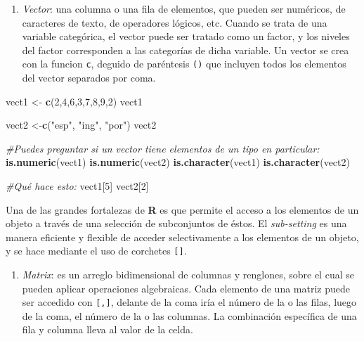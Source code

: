 \documentclass[]{article}
\newenvironment{Shaded}{\begin{snugshade}}{\end{snugshade}}
\newcommand{\CommentTok}[1]{\textcolor[rgb]{0.56,0.35,0.01}{\textit{#1}}}
\newcommand{\DecValTok}[1]{\textcolor[rgb]{0.00,0.00,0.81}{#1}}
\newcommand{\KeywordTok}[1]{\textcolor[rgb]{0.13,0.29,0.53}{\textbf{#1}}}
\newcommand{\NormalTok}[1]{#1}
\newcommand{\StringTok}[1]{\textcolor[rgb]{0.31,0.60,0.02}{#1}}
\providecommand{\tightlist}{%
  \setlength{\itemsep}{0pt}\setlength{\parskip}{0pt}}
\begin{document}
\begin{enumerate}
\def\labelenumi{\Alph{enumi})}
\tightlist
\item
  \emph{Vector}: una columna o una fila de elementos, que pueden ser
  numéricos, de caracteres de texto, de operadores lógicos, etc. Cuando
  se trata de una variable categórica, el vector puede ser tratado como
  un factor, y los niveles del factor corresponden a las categorías de
  dicha variable. Un vector se crea con la funcion \texttt{c}, deguido
  de paréntesis \texttt{()} que incluyen todos los elementos del vector
  separados por coma.
\end{enumerate}

\begin{Shaded}
\begin{Highlighting}[]
\NormalTok{vect1 <-}\StringTok{ }\KeywordTok{c}\NormalTok{(}\DecValTok{2}\NormalTok{,}\DecValTok{4}\NormalTok{,}\DecValTok{6}\NormalTok{,}\DecValTok{3}\NormalTok{,}\DecValTok{7}\NormalTok{,}\DecValTok{8}\NormalTok{,}\DecValTok{9}\NormalTok{,}\DecValTok{2}\NormalTok{)}
\NormalTok{vect1}

\NormalTok{vect2 <-}\KeywordTok{c}\NormalTok{(}\StringTok{"esp"}\NormalTok{, }\StringTok{"ing"}\NormalTok{, }\StringTok{"por"}\NormalTok{)}
\NormalTok{vect2}

\CommentTok{#Puedes preguntar si un vector tiene elementos de un tipo en particular:}
\KeywordTok{is.numeric}\NormalTok{(vect1)}
\KeywordTok{is.numeric}\NormalTok{(vect2)}
\KeywordTok{is.character}\NormalTok{(vect1)}
\KeywordTok{is.character}\NormalTok{(vect2)}

\CommentTok{#Qué hace esto:}
\NormalTok{vect1[}\DecValTok{5}\NormalTok{]}
\NormalTok{vect2[}\DecValTok{2}\NormalTok{]}
\end{Highlighting}
\end{Shaded}

Una de las grandes fortalezas de \textbf{R} es que permite el acceso a
los elementos de un objeto a través de una selección de subconjuntos de
éstos. El \emph{sub-setting} es una manera eficiente y flexible de
acceder selectivamente a los elementos de un objeto, y se hace mediante
el uso de corchetes \texttt{{[}{]}}.

\begin{enumerate}
\def\labelenumi{\Alph{enumi})}
\setcounter{enumi}{1}
\tightlist
\item
  \emph{Matrix}: es un arreglo bidimensional de columnas y renglones,
  sobre el cual se pueden aplicar operaciones algebraicas. Cada elemento
  de una matriz puede ser accedido con \texttt{{[},{]}}, delante de la
  coma iría el número de la o las filas, luego de la coma, el número de
  la o las columnas. La combinación específica de una fila y columna
  lleva al valor de la celda.
\end{enumerate}
\end{document}

